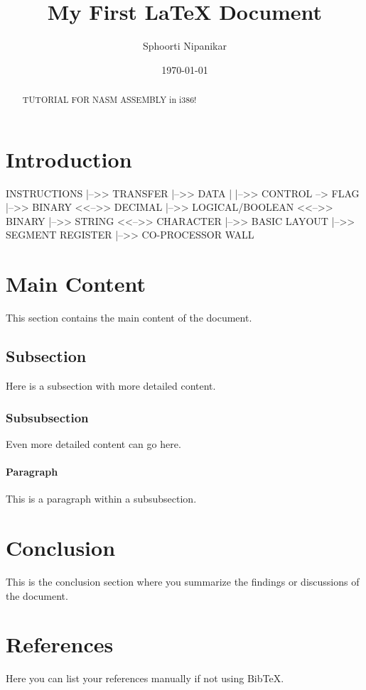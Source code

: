 \documentclass[a4paper,12pt]{article}
\title{My First LaTeX Document}
\author{Sphoorti Nipanikar}
\date{\today}                 %
\begin{document}
\maketitle

\begin{abstract}
TUTORIAL FOR NASM ASSEMBLY in i386!
\end{abstract}

\section{Introduction}
INSTRUCTIONS |-->> TRANSFER |-->> DATA
             |              |-->> CONTROL --> FLAG
             |-->> BINARY <<-->> DECIMAL
             |-->> LOGICAL/BOOLEAN <<-->> BINARY
             |-->> STRING <<-->> CHARACTER
             |-->> BASIC LAYOUT
             |-->> SEGMENT REGISTER
             |-->> CO-PROCESSOR WALL

\section{Main Content}
This section contains the main content of the document.

\subsection{Subsection}
Here is a subsection with more detailed content.

\subsubsection{Subsubsection}
Even more detailed content can go here.

\paragraph{Paragraph}
This is a paragraph within a subsubsection.

\section{Conclusion}
This is the conclusion section where you summarize the findings or discussions of the document.

\section*{References}
% 
% 

Here you can list your references manually if not using BibTeX.
\end{document}

